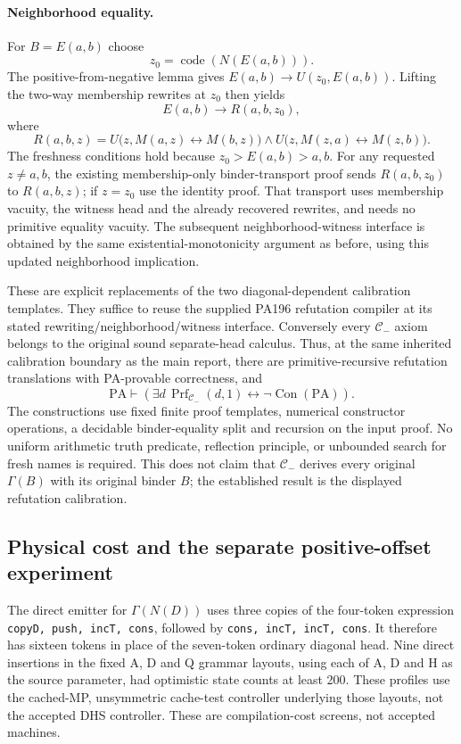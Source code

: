 \paragraph{Neighborhood equality.}
For $B=E(a,b)$ choose
\[
                   z_0=\operatorname{code}(N(E(a,b))).
\]
The positive-from-negative lemma gives
$E(a,b)\to U(z_0,E(a,b))$. Lifting the two-way membership rewrites at
$z_0$ then yields
\[
 E(a,b)\to R(a,b,z_0),
\]
where
\[
 R(a,b,z)=U\bigl(z,M(a,z)\leftrightarrow M(b,z)\bigr)
 \wedge U\bigl(z,M(z,a)\leftrightarrow M(z,b)\bigr).
\]
The freshness conditions hold
because $z_0>E(a,b)>a,b$. For any requested $z\ne a,b$, the existing
membership-only binder-transport proof sends $R(a,b,z_0)$ to $R(a,b,z)$;
if $z=z_0$ use the identity proof. That transport uses membership
vacuity, the witness head and the already recovered rewrites, and needs
no primitive equality vacuity. The subsequent neighborhood-witness
interface is obtained by the same existential-monotonicity argument as
before, using this updated neighborhood implication.

These are explicit replacements of the two diagonal-dependent
calibration templates. They suffice to reuse the supplied PA196
refutation compiler at its stated rewriting/neighborhood/witness
interface. Conversely every $\mathcal C_-$ axiom belongs to the original
sound separate-head calculus. Thus, at the same inherited calibration
boundary as the main report, there are primitive-recursive refutation
translations with PA-provable correctness, and
\[
 \mathrm{PA}\vdash
 \left(\exists d\,\operatorname{Prf}_{\mathcal C_-}(d,1)
        \leftrightarrow\neg\operatorname{Con}(\mathrm{PA})\right).
\]
The constructions use fixed finite proof templates, numerical constructor
operations, a decidable binder-equality split and recursion on the input
proof. No uniform arithmetic truth predicate, reflection principle, or
unbounded search for fresh names is required. This does not claim that
$\mathcal C_-$ derives every original $\Gamma(B)$ with its original
binder $B$; the established result is the displayed refutation calibration.

\subsection{Physical cost and the separate positive-offset experiment}

The direct emitter for $\Gamma(N(D))$ uses three copies of the
four-token expression
\texttt{copyD, push, incT, cons}, followed by
\texttt{cons, incT, incT, cons}. It therefore has sixteen tokens in
place of the seven-token ordinary diagonal head. Nine direct insertions
in the fixed A, D and Q grammar layouts, using each of A, D and H as the
source parameter, had optimistic state counts at least 200. These
profiles use the cached-MP, unsymmetric cache-test controller underlying
those layouts, not the accepted DHS controller. These are
compilation-cost screens, not accepted machines.

